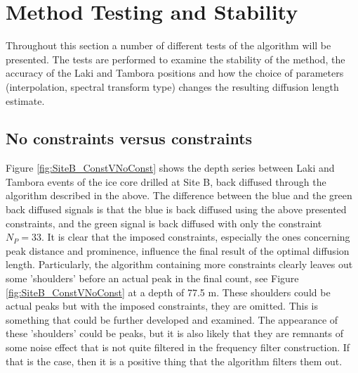 \documentclass[../../CompleteThesis2/Complete_2ndDraft]{subfiles}
\begin{document}



\section[Testing and Stability][Testing and Stability]{Method Testing and Stability}
\label{Sec:Method_TestStab}

Throughout this section a number of different tests of the algorithm will be presented. The tests are performed to examine the stability of the method, the accuracy of the Laki and Tambora positions and how the choice of parameters (interpolation, spectral transform type) changes the resulting diffusion length estimate. 

\subsection[Constraints or No Constraints]{No constraints versus constraints}
\label{Subsec:Method_TestStab_ConstNoConst}
Figure \ref{fig:SiteB_ConstVNoConst} shows the depth series between Laki and Tambora events of the ice core drilled at Site B, back diffused through the algorithm described in the above. The difference between the blue and the green back diffused signals is that the blue is back diffused using the above presented constraints, and the green signal is back diffused with only the constraint $N_P=33$. It is clear that the imposed constraints, especially the ones concerning peak distance and prominence, influence the final result of the optimal diffusion length. Particularly, the algorithm containing more constraints clearly leaves out some 'shoulders' before an actual peak in the final count, see Figure \ref{fig:SiteB_ConstVNoConst} at a depth of 77.5 m. These shoulders could be actual peaks but with the imposed constraints, they are omitted. This is something that could be further developed and examined. The appearance of these 'shoulders' could be peaks, but it is also likely that they are remnants of some noise effect that is not quite filtered in the frequency filter construction. If that is the case, then it is a positive thing that the algorithm filters them out.
\end{document}
